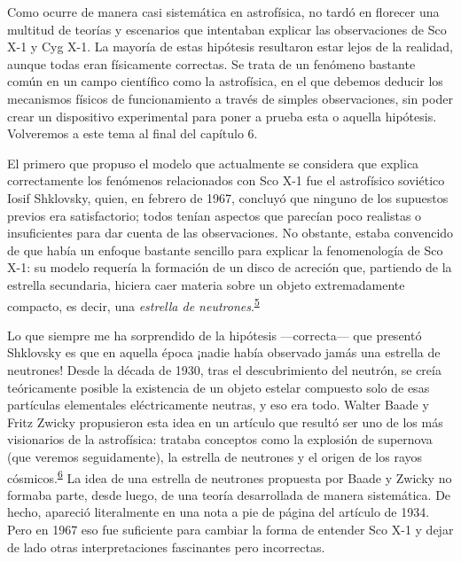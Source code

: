Como ocurre de manera casi sistemática en astrofísica, no tardó en florecer una multitud de teorías y escenarios que intentaban explicar las observaciones de Sco X-1 y Cyg X-1. La mayoría de estas hipótesis resultaron estar lejos de la realidad, aunque todas eran físicamente correctas. Se trata de un fenómeno bastante común en un campo científico como la astrofísica, en el que debemos deducir los mecanismos físicos de funcionamiento a través de simples observaciones, sin poder crear un dispositivo experimental para poner a prueba esta o aquella hipótesis. Volveremos a este tema al final del capítulo 6.

El primero que propuso el modelo que actualmente se considera que explica correctamente los fenómenos relacionados con Sco X-1 fue el astrofísico soviético Iosif Shklovsky, quien, en febrero de 1967, concluyó que ninguno de los supuestos previos era satisfactorio; todos tenían aspectos que parecían poco realistas o insuficientes para dar cuenta de las observaciones. No obstante, estaba convencido de que había un enfoque bastante sencillo para explicar la fenomenología de Sco X-1: su modelo requería la formación de un disco de acreción que, partiendo de la estrella secundaria, hiciera caer materia sobre un objeto extremadamente compacto, es decir, una \emph{estrella de neutrones}.\textsuperscript{\hyperlink{note:05-05}{5}}

Lo que siempre me ha sorprendido de la hipótesis ---correcta--- que presentó Shklovsky es que en aquella época ¡nadie había observado jamás una estrella de neutrones! Desde la década de 1930, tras el descubrimiento del neutrón, se creía teóricamente posible la existencia de un objeto estelar compuesto solo de esas partículas elementales eléctricamente neutras, y eso era todo. Walter Baade y Fritz Zwicky propusieron esta idea en un artículo que resultó ser uno de los más visionarios de la astrofísica: trataba conceptos como la explosión de supernova (que veremos seguidamente), la estrella de neutrones y el origen de los rayos cósmicos.\textsuperscript{\hyperlink{note:05-06}{6}} La idea de una estrella de neutrones propuesta por Baade y Zwicky no formaba parte, desde luego, de una teoría desarrollada de manera sistemática. De hecho, apareció literalmente en una nota a pie de página del artículo de 1934. Pero en 1967 eso fue suficiente para cambiar la forma de entender Sco X-1 y dejar de lado otras interpretaciones fascinantes pero incorrectas.

